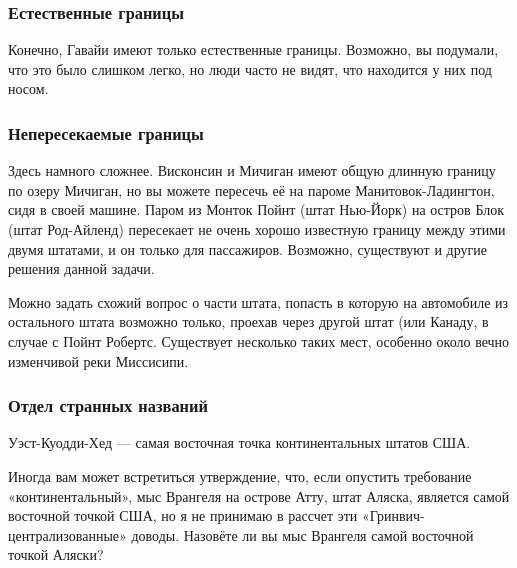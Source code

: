 \subsubsection*{Естественные границы}%


Конечно, Гавайи  имеют только естественные границы. Возможно, вы подумали, что это было слишком легко, но люди часто не видят, что находится у них под носом. 
\heart




\subsubsection*{Непересекаемые границы}%


Здесь намного сложнее. Висконсин и Мичиган имеют общую длинную границу по озеру Мичиган, но вы можете пересечь её на пароме Манитовок-Ладингтон, сидя в своей машине. Паром из Монток Пойнт %
(штат Нью-Йорк) на остров Блок %
(штат Род-Айленд) пересекает не очень хорошо известную границу между этими двумя штатами, и он только для пассажиров. 
Возможно, существуют и другие решения данной задачи.\heart
                                                                                                                    


Можно задать схожий вопрос о части штата, попасть в которую на автомобиле из остального штата возможно только, проехав через другой штат (или Канаду, в случае с 
Пойнт Робертс. %
Существует несколько таких мест, особенно около вечно изменчивой реки Миссисипи.




\subsubsection*{Отдел странных названий}%


Уэст-Куодди-Хед %
--- самая восточная точка континентальных штатов США.\heart
                                                                                                                


Иногда вам может встретиться утверждение,  что, если опустить  требование «континентальный», мыс Врангеля %
на острове Атту, %
штат Аляска, является самой восточной точкой США,  но я не принимаю в рассчет эти «Гринвич-централизованные»  доводы. 
Назовёте ли вы мыс Врангеля самой восточной точкой Аляски?




